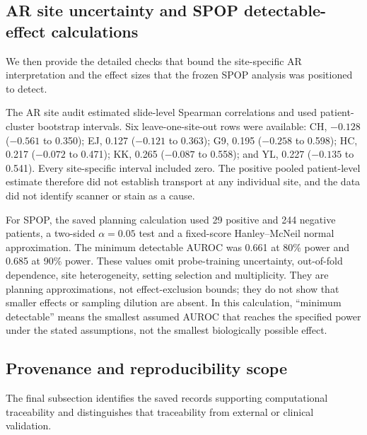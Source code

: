 \clearpage

\subsection*{AR site uncertainty and SPOP detectable-effect calculations}

We then provide the detailed checks that bound the site-specific AR interpretation and the
effect sizes that the frozen SPOP analysis was positioned to detect.

The AR site audit estimated slide-level Spearman correlations and used patient-cluster
bootstrap intervals. Six leave-one-site-out rows were available: CH, $-0.128$
($-0.561$ to 0.350); EJ, 0.127 ($-0.121$ to 0.363); G9, 0.195 ($-0.258$ to 0.598);
HC, 0.217 ($-0.072$ to 0.471); KK, 0.265 ($-0.087$ to 0.558); and YL, 0.227
($-0.135$ to 0.541). Every site-specific interval included zero. The positive pooled
patient-level estimate therefore did not establish transport at any individual site, and
the data did not identify scanner or stain as a cause.

For SPOP, the saved planning calculation used 29 positive and 244 negative patients, a
two-sided $\alpha=0.05$ test and a fixed-score Hanley--McNeil normal approximation. The
minimum detectable AUROC was 0.661 at 80\% power and 0.685 at 90\% power. These values omit
probe-training uncertainty, out-of-fold dependence, site heterogeneity, setting selection
and multiplicity. They are planning approximations, not effect-exclusion bounds; they do
not show that smaller effects or sampling dilution are absent. In this calculation,
``minimum detectable'' means the smallest assumed AUROC that reaches the specified power
under the stated assumptions, not the smallest biologically possible effect.

\subsection*{Provenance and reproducibility scope}

The final subsection identifies the saved records supporting computational traceability and
distinguishes that traceability from external or clinical validation.

